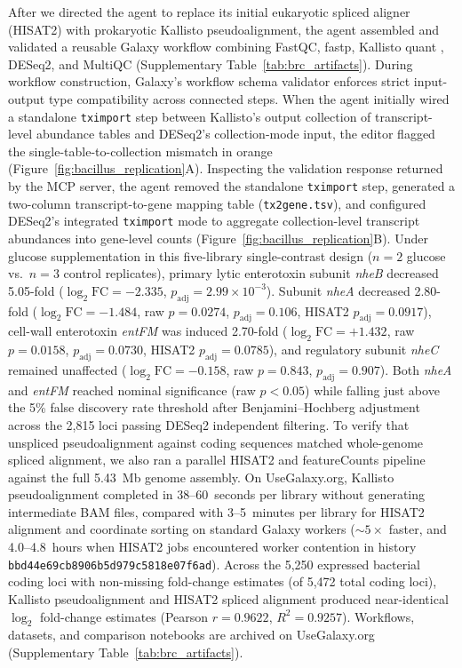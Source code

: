 \documentclass[11pt,letterpaper]{article}
\begin{document}
After we directed the agent to replace its initial eukaryotic spliced aligner (HISAT2) with prokaryotic Kallisto pseudoalignment, the agent assembled and validated a reusable Galaxy workflow combining FastQC, fastp, Kallisto quant \cite{bray2016near}, DESeq2, and MultiQC (Supplementary Table~\ref{tab:brc_artifacts}). During workflow construction, Galaxy's workflow schema validator enforces strict input-output type compatibility across connected steps. When the agent initially wired a standalone \texttt{tximport} step between Kallisto's output collection of transcript-level abundance tables and DESeq2's collection-mode input, the editor flagged the single-table-to-collection mismatch in orange (Figure~\ref{fig:bacillus_replication}A). Inspecting the validation response returned by the MCP server, the agent removed the standalone \texttt{tximport} step, generated a two-column transcript-to-gene mapping table (\texttt{tx2gene.tsv}), and configured DESeq2's integrated \texttt{tximport} mode to aggregate collection-level transcript abundances into gene-level counts (Figure~\ref{fig:bacillus_replication}B). Under glucose supplementation in this five-library single-contrast design ($n = 2$ glucose vs.\ $n = 3$ control replicates), primary lytic enterotoxin subunit \textit{nheB} decreased 5.05-fold ($\log_2\text{FC} = -2.335$, $p_{\text{adj}} = 2.99 \times 10^{-3}$). Subunit \textit{nheA} decreased 2.80-fold ($\log_2\text{FC} = -1.484$, raw $p = 0.0274$, $p_{\text{adj}} = 0.106$, HISAT2 $p_{\text{adj}} = 0.0917$), cell-wall enterotoxin \textit{entFM} was induced 2.70-fold ($\log_2\text{FC} = +1.432$, raw $p = 0.0158$, $p_{\text{adj}} = 0.0730$, HISAT2 $p_{\text{adj}} = 0.0785$), and regulatory subunit \textit{nheC} remained unaffected ($\log_2\text{FC} = -0.158$, raw $p = 0.843$, $p_{\text{adj}} = 0.907$). Both \textit{nheA} and \textit{entFM} reached nominal significance (raw $p < 0.05$) while falling just above the 5\% false discovery rate threshold after Benjamini--Hochberg adjustment across the 2,815 loci passing DESeq2 independent filtering. To verify that unspliced pseudoalignment against coding sequences matched whole-genome spliced alignment, we also ran a parallel HISAT2 and featureCounts pipeline against the full 5.43~Mb genome assembly. On UseGalaxy.org, Kallisto pseudoalignment completed in 38--60~seconds per library without generating intermediate BAM files, compared with 3--5~minutes per library for HISAT2 alignment and coordinate sorting on standard Galaxy workers ($\sim 5\times$ faster, and 4.0--4.8~hours when HISAT2 jobs encountered worker contention in history \texttt{bbd44e69cb8906b5d979c5818e07f6ad}). Across the 5,250 expressed bacterial coding loci with non-missing fold-change estimates (of 5,472 total coding loci), Kallisto pseudoalignment and HISAT2 spliced alignment produced near-identical $\log_2$ fold-change estimates (Pearson $r = 0.9622$, $R^2 = 0.9257$). Workflows, datasets, and comparison notebooks are archived on UseGalaxy.org (Supplementary Table~\ref{tab:brc_artifacts}).
\end{document}
